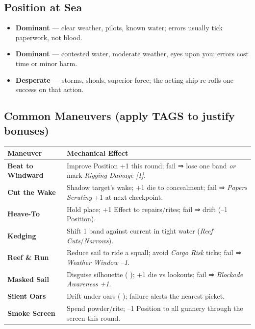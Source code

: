 \documentclass[11pt,oneside]{book}
\newcommand{\tagpill}[1]{\begingroup
  \setlength{\fboxsep}{1pt}\color{black}\fbox{\footnotesize\textsf{#1}}
\endgroup}
\begin{document}
\subsection*{Position at Sea}
\begin{itemize}
  \item \textbf{Dominant} --- clear weather, pilots, known water; errors usually tick paperwork, not blood.
  \item \textbf{Dominant} --- contested water, moderate weather, eyes upon you; errors cost time or minor harm.
  \item \textbf{Desperate} --- storms, shoals, superior force; the acting ship re-rolls one success on that action.
\end{itemize}

\subsection*{Common Maneuvers (apply TAGS to justify bonuses)}
\begin{tabularx}{\linewidth}{@{}p{3.3cm} X@{}}
\toprule
\textbf{Maneuver} & \textbf{Mechanical Effect}\\
\midrule
\textbf{Beat to Windward} & Improve Position +1 this round; fail ⇒ lose one band \emph{or} mark \textit{Rigging Damage [1]}.\\
\textbf{Cut the Wake} & Shadow target's wake; +1 die to concealment; fail ⇒ \textit{Papers Scrutiny} +1 at next checkpoint.\\
\textbf{Heave-To} & Hold place; +1 Effect to repairs/rites; fail ⇒ drift (--1 Position).\\
\textbf{Kedging} & Shift 1 band against current in tight water (\emph{Reef Cuts}/\emph{Narrows}).\\
\textbf{Reef \& Run} & Reduce sail to ride a squall; avoid \textit{Cargo Risk} ticks; fail ⇒ \textit{Weather Window --1}.\\
\textbf{Masked Sail} & Disguise silhouette (\tagpill{DISGUISE}); +1 die vs lookouts; fail ⇒ \textit{Blockade Awareness +1}.\\
\textbf{Silent Oars} & Drift under oars (\tagpill{SILENT RIG}); failure alerts the nearest picket.\\
\textbf{Smoke Screen} & Spend powder/rite; --1 Position to all gunnery through the screen this round.\\
\bottomrule
\end{tabularx}

\end{document}
